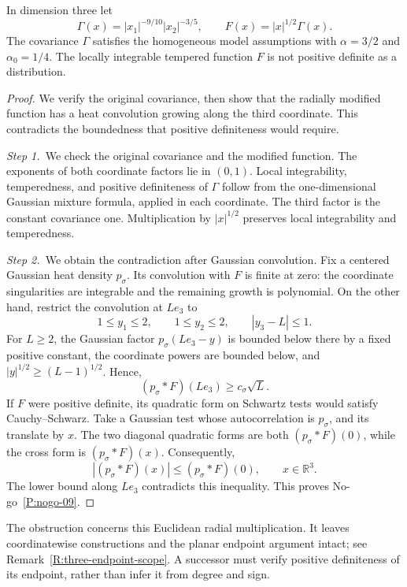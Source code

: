 \setcounter{nogo}{8}
\begin{nogo}\label{P:nogo-09}
  In dimension three let
  \[
    \Gamma(x)=|x_1|^{-9/10}|x_2|^{-3/5},\qquad
    F(x)=|x|^{1/2}\Gamma(x).
  \]
  The covariance $\Gamma$ satisfies the homogeneous model assumptions with
  $\alpha=3/2$ and $\alpha_0=1/4$. The locally integrable tempered function
  $F$ is not positive definite as a distribution.
\end{nogo}
\begin{proof}
  We verify the original covariance, then show that the radially modified
  function has a heat convolution growing along the third coordinate. This
  contradicts the boundedness that positive definiteness would require.


  \medskip
  \noindent\textit{Step 1.~}We check the original covariance and the modified
  function.
  The exponents of both coordinate factors lie in $(0,1)$. Local
  integrability, temperedness, and positive definiteness of $\Gamma$
  follow from the one-dimensional Gaussian mixture formula, applied in
  each coordinate. The third factor is the constant covariance one.
  Multiplication by $|x|^{1/2}$ preserves local integrability and temperedness.


  \medskip
  \noindent\textit{Step 2.~}We obtain the contradiction after Gaussian
  convolution.
  Fix a centered Gaussian heat density $p_\sigma$. Its convolution with
  $F$ is finite at zero: the coordinate singularities are integrable and
  the remaining growth is polynomial. On the other hand, restrict the
  convolution at $Le_3$ to
  \[
    1\le y_1\le2,\qquad 1\le y_2\le2,\qquad |y_3-L|\le1.
  \]
  For $L\ge2$, the Gaussian factor $p_\sigma(Le_3-y)$ is bounded below
  there by a fixed positive constant, the coordinate powers are bounded
  below, and $|y|^{1/2}\ge(L-1)^{1/2}$. Hence,
  \[
    (p_\sigma*F)(Le_3)\ge c_\sigma\sqrt L.
  \]
  If $F$ were positive definite, its quadratic form on Schwartz tests
  would satisfy Cauchy--Schwarz. Take a Gaussian test whose autocorrelation
  is $p_\sigma$, and its translate by $x$. The two diagonal quadratic
  forms are both $(p_\sigma*F)(0)$, while the cross form is
  $(p_\sigma*F)(x)$. Consequently,
  \[
    |(p_\sigma*F)(x)|\le(p_\sigma*F)(0),\qquad x\in\mathbb R^3.
  \]
  The lower bound along $Le_3$ contradicts this inequality.
  This proves No-go~\ref{P:nogo-09}.
\end{proof}

The obstruction concerns this Euclidean radial multiplication. It leaves
coordinatewise constructions and the planar endpoint argument intact;
see Remark~\ref{R:three-endpoint-scope}. A successor must verify positive
definiteness of its endpoint, rather than infer it from degree and sign.

